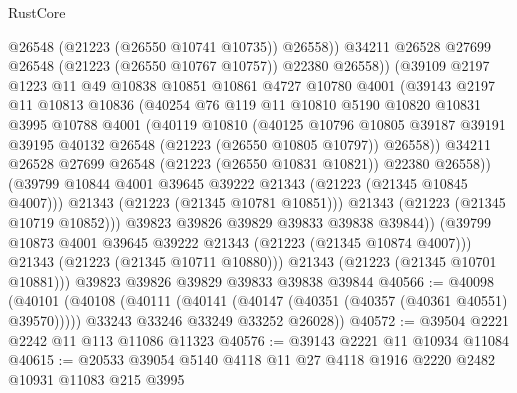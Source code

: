 \begin{lexlean}{RustCore}
\begin{coremodule}
                      @26548
                      (@21223 (@26550 @10741 @10735))
                      @26558))
                  @34211
                  @26528
                  @27699
                  @26548
                  (@21223 (@26550 @10767 @10757))
                  @22380
                  @26558))
              (@39109
                @2197
                @1223
                @11
                @49
                @10838
                @10851
                @10861
                @4727
                @10780
                @4001
                (@39143
                  @2197
                  @11
                  @10813
                  @10836
                  (@40254
                    @76
                    @119
                    @11
                    @10810
                    @5190
                    @10820
                    @10831
                    @3995
                    @10788
                    @4001
                    (@40119
                      @10810
                      (@40125
                        @10796
                        @10805
                        @39187
                        @39191
                        @39195
                        @40132
                        @26548
                        (@21223 (@26550 @10805 @10797))
                        @26558))
                    @34211
                    @26528
                    @27699
                    @26548
                    (@21223 (@26550 @10831 @10821))
                    @22380
                    @26558))
                (@39799 @10844 @4001 @39645 @39222 @21343 (@21223 (@21345 @10845 @4007)))
                @21343
                (@21223 (@21345 @10781 @10851)))
              @21343
              (@21223 (@21345 @10719 @10852)))
            @39823
            @39826
            @39829
            @39833
            @39838
            @39844))
        (@39799 @10873 @4001 @39645 @39222 @21343 (@21223 (@21345 @10874 @4007)))
        @21343
        (@21223 (@21345 @10711 @10880)))
      @21343
      (@21223 (@21345 @10701 @10881)))
    @39823
    @39826
    @39829
    @39833
    @39838
    @39844
@40566 := @40098
    (@40101
      (@40108
        (@40111 (@40141 (@40147 (@40351 (@40357 (@40361 @40551) @39570)))))
        @33243
        @33246
        @33249
        @33252
        @26028))
@40572 := @39504 @2221 @2242 @11 @113 @11086 @11323
@40576 := @39143 @2221 @11 @10934 @11084
@40615 := @20533
    @39054
    @5140
    @4118
    @11
    @27
    @4118
    @1916
    @2220
    @2482
    @10931
    @11083
    @215
    @3995

\end{coremodule}
\end{lexlean}
